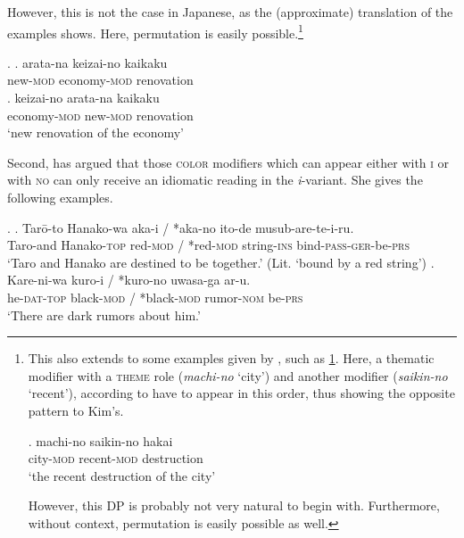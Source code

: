 However, this is not the case in Japanese, as the (approximate) translation of the examples shows. Here, permutation is easily possible.\footnote{This also extends to some examples given by \citet{laenzlinger:2011:elements}, such as \ref{machi-no saikin-no}. Here, a thematic modifier with a \textsc{theme} role (\textit{machi-no} `city’) and another modifier (\textit{saikin-no} `recent’), according to \citet{laenzlinger:2011:elements} have to appear in this order, thus showing the opposite pattern to Kim’s.

\par

\exg. machi-no saikin-no hakai\\
city-\textsc{mod} recent-\textsc{mod} destruction\\
`the recent destruction of the city’ \hfill \citep[227–228]{laenzlinger:2011:elements} \label{machi-no saikin-no}

\par


However, this DP is probably not very natural to begin with. Furthermore, without context, permutation is easily possible as well.}

\ex. \ag. arata-na keizai-no kaikaku\\
new-\textsc{mod} economy-\textsc{mod} renovation\\
\bg. keizai-no arata-na kaikaku\\
economy-\textsc{mod} new-\textsc{mod} renovation\\
`new renovation of the economy'

Second, \citet{okami:2012:two} has argued that those \textsc{color} modifiers which can appear either with \textsc{i} or with \textsc{no} can only receive an idiomatic reading in the \textit{i}-variant. She gives the following examples.

\ex. \ag. Tarō-to Hanako-wa aka-i / *aka-no ito-de musub-are-te-i-ru.\\
Taro-and Hanako-\textsc{top} red-\textsc{mod} / *red-\textsc{mod} string-\textsc{ins} bind-\textsc{pass-ger}-be-\textsc{prs}\\
`Taro and Hanako are destined to be together.’ (Lit. `bound by a red string’)
\bg. Kare-ni-wa kuro-i / *kuro-no uwasa-ga ar-u.\\
he-\textsc{dat-top} black-\textsc{mod} / *black-\textsc{mod} rumor-\textsc{nom} be-\textsc{prs}\\
`There are dark rumors about him.’ \hfill \citep[96]{okami:2012:two}


